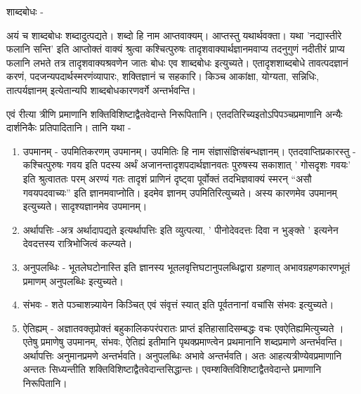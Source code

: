 शाब्दबोधः -

अयं च शाब्दबोधः शब्दादुत्पद्यते। शब्दो हि नाम आप्तवाक्यम्। आप्तस्तु यथार्थवक्ता। यथा ’नद्यास्तीरे फलानि सन्ति’ इति आप्तोक्तं वाक्यं श्रुत्वा कश्चित्पुरुषः तादृशवाक्यार्थज्ञानमवाप्य तदनुगुणं नदीतीरं प्राप्य फलानि लभते तत्र तादृशवाक्यश्रवणेन जातः बोधः एव शाब्दबोधः इत्युच्यते। एतादृशशाब्दबोधे तावत्पदज्ञानं करणं, पदजन्यपदार्थस्मरणंव्यापारः, शक्तिज्ञानं च सहकारि। किञ्च आकांक्षा, योग्यता, सन्निधिः, तात्पर्यज्ञानम् इत्येतान्यपि शाब्दबोधकारणवर्गे अन्तर्भवन्ति।

एवं रीत्या त्रीणि प्रमाणानि शक्तिविशिष्टाद्वैतवेदान्ते निरूपितानि। एतदतिरिच्यइतोऽपिपञ्चप्रमाणानि अन्यैः दार्शनिकैः प्रतिपादितानि। तानि यथा -
\begin{enumerate}
\item उपमानम् - उपमितिकरणम् उपमानम्। उपमितिः हि नाम संज्ञासंज्ञिसंबन्धज्ञानम्। एतदवाप्तिप्रकारस्तु - कश्चित्पुरुषः गवय इति पदस्य अर्थं अजानन्तादृशपदार्थज्ञानवतः पुरुषस्य सकाशात् ’  गोसदृशः गवयः’ इति श्रुत्वाततः परम् अरण्यं गतः तादृशं प्राणिनं दृष्ट्वा पूर्वोक्तं तदभिज्ञवाक्यं स्मरन् “असौ गवयपदवाच्यः” इति ज्ञानमवाप्नोति। इदमेव ज्ञानम् उपमितिरित्युच्यते। अस्य कारणमेव उपमानम् इत्युच्यते। सादृश्यज्ञानमेव उपमानम्।
\item अर्थापत्तिः -अत्र अर्थादापद्यते इत्यर्थापत्तिः इति व्युत्पत्या, ’ पीनोदेवदत्तः दिवा न भुङ्क्ते ’ इत्यनेन देवदत्तस्य रात्रिभोजित्वं कल्प्यते।
\item अनुपलब्धिः - भूतलेघटोनास्ति इति ज्ञानस्य भूतलवृत्तिघटानुपलब्धिद्वारा ग्रहणात् अभावग्रहणकारणभूतं प्रमाणम् अनुपलब्धिः इत्युच्यते।
\item संभवः - शते पञ्चाशन्न्यायेन किञ्चित् एवं संवृत्तं स्यात् इति पूर्वतनानां वचांसि संभवः इत्युच्यते।
\item ऐतिह्यम् - अज्ञातवक्तृप्रोक्तं बहुकालिकपरंपरातः प्राप्तं इतिहासादिसम्बद्धः वचः एवऐतिह्यमित्युच्यते । एतेषु प्रमाणेषु उपमानम्, संभवः, ऐतिह्यं इतीमानि पृथक्प्रमाण्त्वेन प्रथमानानि शब्दप्रमाणे अन्तर्भवन्ति। अर्थापत्तिः अनुमानप्रमणे अन्तर्भवति। अनुपलब्धिः अभावे अन्तर्भवति। अतः आहत्यत्रीण्येवप्रमाणानि अन्ततः सिध्यन्तीति शक्तिविशिष्टाद्वैतवेदान्तसिद्धान्तः।
एवम्शक्तिविशिष्टाद्वैतवेदान्ते प्रमाणानि निरूपितानि।
\end{enumerate}
\articleend
